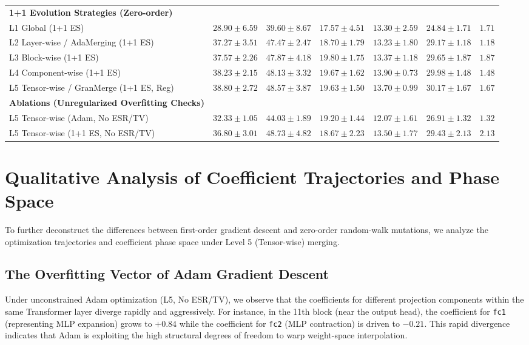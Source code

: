 \documentclass{article}
\theoremstyle{plain}
\theoremstyle{definition}
\theoremstyle{remark}
\begin{document}
\begin{table}[h]
\begin{small}
\begin{sc}
{\begin{tabular}{lcccccc}
\midrule
\textbf{1+1 Evolution Strategies (Zero-order)} \\
L1 Global (1+1 ES) & $28.90 \pm 6.59$ & $39.60 \pm 8.67$ & $17.57 \pm 4.51$ & $13.30 \pm 2.59$ & $24.84 \pm 1.71$ & $1.71$ \\
L2 Layer-wise / AdaMerging (1+1 ES) & $37.27 \pm 3.51$ & $47.47 \pm 2.47$ & $18.70 \pm 1.79$ & $13.23 \pm 1.80$ & $29.17 \pm 1.18$ & $1.18$ \\
L3 Block-wise (1+1 ES) & $37.57 \pm 2.26$ & $47.87 \pm 4.18$ & $19.80 \pm 1.75$ & $13.37 \pm 1.18$ & $29.65 \pm 1.87$ & $1.87$ \\
L4 Component-wise (1+1 ES) & $38.23 \pm 2.15$ & $48.13 \pm 3.32$ & $19.67 \pm 1.62$ & $13.90 \pm 0.73$ & $29.98 \pm 1.48$ & $1.48$ \\
L5 Tensor-wise / GranMerge (1+1 ES, Reg) & $38.80 \pm 2.72$ & $48.57 \pm 3.87$ & $19.63 \pm 1.50$ & $13.70 \pm 0.99$ & $30.17 \pm 1.67$ & $1.67$ \\
\midrule
\textbf{Ablations (Unregularized Overfitting Checks)} \\
L5 Tensor-wise (Adam, No ESR/TV) & $32.33 \pm 1.05$ & $44.03 \pm 1.89$ & $19.20 \pm 1.44$ & $12.07 \pm 1.61$ & $26.91 \pm 1.32$ & $1.32$ \\
L5 Tensor-wise (1+1 ES, No ESR/TV) & $36.80 \pm 3.01$ & $48.73 \pm 4.82$ & $18.67 \pm 2.23$ & $13.50 \pm 1.77$ & $29.43 \pm 2.13$ & $2.13$ \\
\bottomrule
\end{tabular}%
}
\end{sc}
\end{small}
\end{table}

\section{Qualitative Analysis of Coefficient Trajectories and Phase Space}
\label{app:trajectories}

To further deconstruct the differences between first-order gradient descent and zero-order random-walk mutations, we analyze the optimization trajectories and coefficient phase space under Level 5 (Tensor-wise) merging.

\subsection{The Overfitting Vector of Adam Gradient Descent}
Under unconstrained Adam optimization (L5, No ESR/TV), we observe that the coefficients for different projection components within the same Transformer layer diverge rapidly and aggressively. For instance, in the 11th block (near the output head), the coefficient for \texttt{fc1} (representing MLP expansion) grows to $+0.84$ while the coefficient for \texttt{fc2} (MLP contraction) is driven to $-0.21$. This rapid divergence indicates that Adam is exploiting the high structural degrees of freedom to warp weight-space interpolation.
\end{document}
